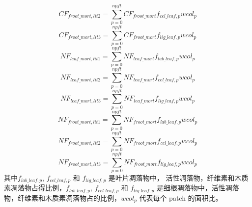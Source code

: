 \begin{equation}
CF_{froot\_mort,lit2}=\sum_{p=0}^{npft}{CF_{froot\_mort}f_{cel\_{leaf},p}{wcol_p}}
\end{equation}
\begin{equation}
CF_{froot\_mort,lit3}=\sum_{p=0}^{npft}{CF_{froot\_mort}f_{lig\_{leaf},p}{wcol_p}}
\end{equation}
\begin{equation}
NF_{leaf\_{mort},lit1}=\sum_{p=0}^{npft}{NF_{leaf\_{mort}}f_{lab\_{leaf},p}{wcol_p}}
\end{equation}
\begin{equation}
  NF_{leaf\_{mort},lit2}=\sum_{p=0}^{npft}{NF_{leaf\_{mort}}f_{cel\_{leaf},p}{wcol_p}}
\end{equation}
\begin{equation}
  NF_{leaf\_{mort},lit3}=\sum_{p=0}^{npft}{NF_{leaf\_{mort}}f_{lig\_{leaf},p}{wcol_p}}
\end{equation}
\begin{equation}
  NF_{froot\_mort,lit1}=\sum_{p=0}^{npft}{NF_{froot\_mort}f_{lab\_{leaf},p}{wcol_p}}
\end{equation}
\begin{equation}
  NF_{froot\_mort,lit2}=\sum_{p=0}^{npft}{NF_{froot\_mort}f_{cel\_{leaf},p}{wcol_p}}
\end{equation}
\begin{equation}
  NF_{froot\_mort,lit3}=\sum_{p=0}^{npft}{NF_{froot\_mort}f_{lig\_{leaf},p}{wcol_p}}
\end{equation}
其中$f_{lab\_{leaf},p}$, $f_{cel\_{leaf},p}$ 和 $f_{lig\_{leaf},p}$ 是叶片凋落物中，
活性凋落物，纤维素和木质素凋落物占得比例，$f_{lab\_{leaf},p}$, $f_{cel\_{leaf},p}$ 和 $f_{lig\_leaf,p}$
是细根凋落物中，活性凋落物，纤维素和木质素凋落物占的比例，${wcol_p}$ 代表每个 patch 的面积比。


